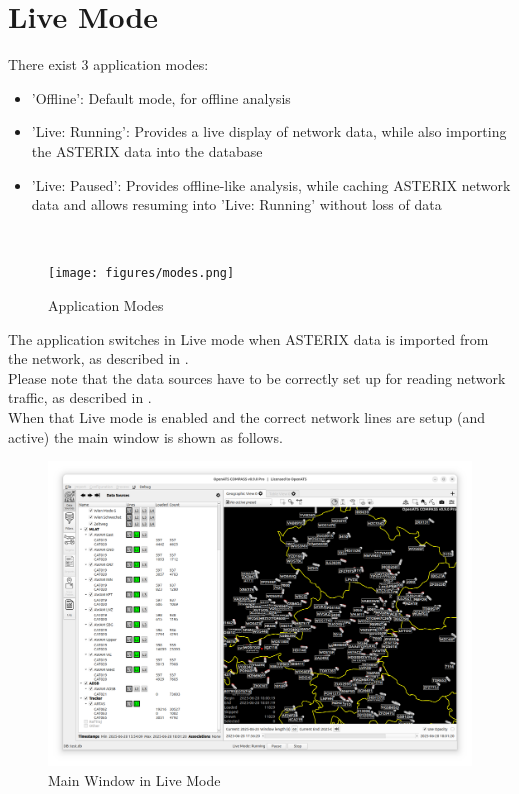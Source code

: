 \chapter{Live Mode}
\label{sec:live_mode}

There exist 3 application modes:
\begin{itemize}
\item 'Offline': Default mode, for offline analysis
\item 'Live: Running': Provides a live display of network data, while also importing the ASTERIX data into the database
\item 'Live: Paused': Provides offline-like analysis, while caching ASTERIX network data and allows resuming into 'Live: Running' without loss of data
\end{itemize}
\ \\

\begin{figure}[H]
 \center
    \texttt{[image: figures/modes.png]}
  \caption{Application Modes}
\end{figure}


The application switches in Live mode when ASTERIX data is imported from the network, as described in . \\

Please note that the data sources have to be correctly set up for reading network traffic, as described in . \\

When that Live mode is enabled and the correct network lines are setup (and active) the main window is shown as follows. 

\begin{figure}[H]
  \hspace*{-2.5cm}
    \includegraphics[width=19cm]{figures/live_mode.png}
  \caption{Main Window in Live Mode}
\end{figure}

